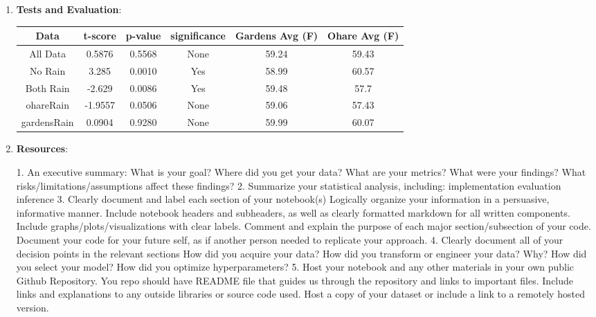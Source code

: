\documentclass[10pt]{article}
\begin{document}
\begin{enumerate}[\null]
\item \textbf{Tests and Evaluation}:

\begin{table}[h]
\begin{tabular}{|c|c|c|c|c|c|}
\hline
Data        & t-score & p-value & significance & Gardens Avg (F) & Ohare Avg (F) \\ \hline
All Data    & 0.5876  & 0.5568  & None         & 59.24           & 59.43         \\ \hline
No Rain     & 3.285   & 0.0010  & Yes          & 58.99           & 60.57         \\ \hline
Both Rain   & -2.629  & 0.0086  & Yes          & 59.48           & 57.7          \\ \hline
ohareRain   & -1.9557 & 0.0506  & None         & 59.06           & 57.43         \\ \hline
gardensRain & 0.0904  & 0.9280  & None         & 59.99           & 60.07         \\ \hline
\end{tabular}
\end{table}

\item \textbf{Resources}:

1.  An executive summary:
What is your goal?
Where did you get your data?
What are your metrics?
What were your findings?
What risks/limitations/assumptions affect these findings?
2. Summarize your statistical analysis, including:
implementation
evaluation
inference
3. Clearly document and label each section of your notebook(s)
Logically organize your information in a persuasive, informative manner.
Include notebook headers and subheaders, as well as clearly formatted markdown for all written components.
Include graphs/plots/visualizations with clear labels.
Comment and explain the purpose of each major section/subsection of your code.
Document your code for your future self, as if another person needed to replicate your approach.
4. Clearly document all of your decision points in the relevant sections
How did you acquire your data?
How did you transform or engineer your data? Why?
How did you select your model?
How did you optimize hyperparameters?
5. Host your notebook and any other materials in your own public Github Repository.
You repo should have README file that guides us through the repository and links to important files.
Include links and explanations to any outside libraries or source code used.
Host a copy of your dataset or include a link to a remotely hosted version.

\end{enumerate}

 
\end{document}
